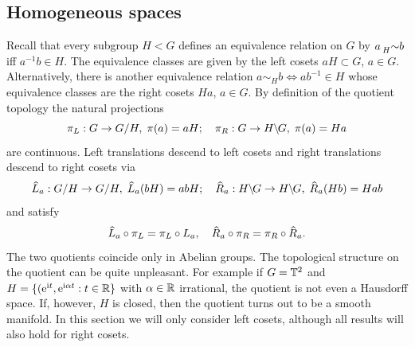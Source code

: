 \subsection{Homogeneous spaces}\label{sec: homogeneous spaces}

Recall that every subgroup  $H<G$ defines an equivalence relation on $G$ by $a\prescript{}{H}{\sim}b$ iff $a^{-1}b\in H$. The equivalence classes are given by the left cosets $aH\subset G$, $a\in G$. Alternatively, there is another equivalence relation $a\sim_H b\Leftrightarrow ab^{-1}\in H$ whose equivalence classes are the right cosets $Ha$, $a\in G$.  By definition of the quotient topology the natural projections
\[\pi_L:G\to G\slash H,\;\pi(a)=aH;\quad \pi_R:G\to H\mkern-.5mu\backslash\mkern-2mu G,\;\pi(a)=Ha\]
are continuous. Left translations descend to left cosets and right translations descend to right cosets via
\[\wh{L}_a:G\slash H\to G\slash H,\; \wh{L}_a(bH)=abH;\quad \wh{R}_a: H\bslash G\to H\bslash G,\; \wh{R}_a(Hb)=Hab\]
and satisfy
\[\wh{L}_a\circ \pi_L=\pi_L\circ L_a,\quad \wh{R}_a\circ \pi_R=\pi_R\circ \wh{R}_a.\]
The two quotients coincide only in Abelian groups. The topological structure on the quotient can be quite unpleasant. For example if $G=\mathbb{T}^2$ and $H=\{(\mathrm{e}^{\mathrm{i} t},\mathrm{e}^{\mathrm{i}\alpha t}:t\in \mathbb{R}\}$ with $\alpha \in\mathbb{R}$ irrational, the quotient is not even a Hausdorff space. If, however, $H$ is closed, then the quotient turns out to be a smooth manifold. In this section we will only consider left cosets, although all results will also hold for right cosets. 


